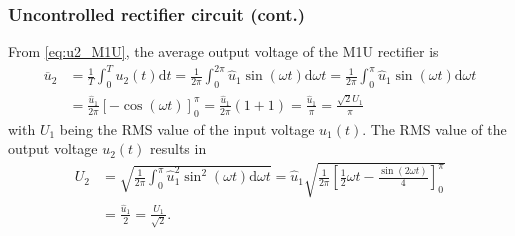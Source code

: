 \begin{frame}
    \frametitle{Uncontrolled rectifier circuit (cont.)}
    From \eqref{eq:u2_M1U}, the average output voltage of the M1U rectifier is
    \begin{equation}
        \begin{split}
            \overline{u}_2 &= \frac{1}{T} \int_{0}^{T} u_2(t) \mathrm{d}t = \frac{1}{2\pi} \int_{0}^{2\pi} \hat{u}_1 \sin(\omega t) \mathrm{d}\omega t = \frac{1}{2\pi} \int_{0}^{\pi} \hat{u}_1 \sin(\omega t) \mathrm{d}\omega t\\
            &= \frac{\hat{u}_1}{2\pi} \left[ - \cos(\omega t) \right]_{0}^{\pi} = \frac{\hat{u}_1}{2\pi} \left( 1+1 \right) = \frac{\hat{u}_1}{\pi} = \frac{\sqrt{2}U_1}{\pi}
        \end{split}
        \label{eq:u2_M1U_avg}
    \end{equation}
    with $U_1$ being the RMS value of the input voltage $u_1(t)$. The RMS value of the output voltage $u_2(t)$ results in
    \begin{equation}
        \begin{split}
        U_2 &= \sqrt{\frac{1}{2\pi} \int_{0}^{\pi} \hat{u}_1^2 \sin^2(\omega t) \mathrm{d}\omega t} = \hat{u}_1 \sqrt{\frac{1}{2\pi}\left[\frac{1}{2}\omega t - \frac{\sin(2 \omega t)}{4}\right]_0^\pi}\\&= \frac{\hat{u}_1}{2} = \frac{U_1}{\sqrt{2}}.
        \end{split}
        \label{eq:u2_M1U_rms}
    \end{equation}
\end{frame}

